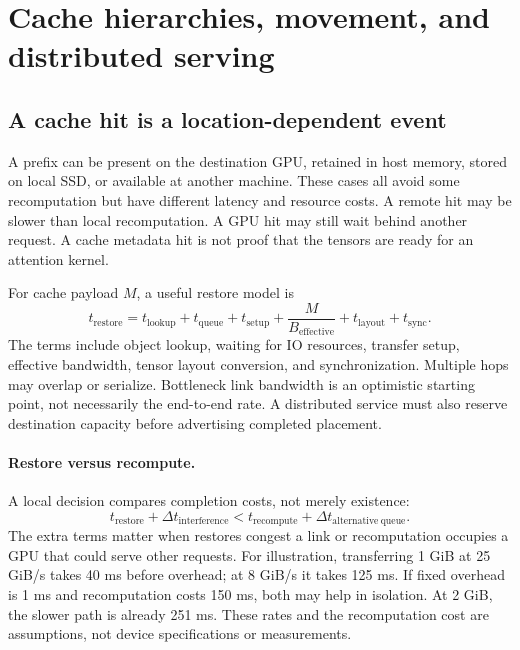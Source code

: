 \section{Cache hierarchies, movement, and distributed serving}
\label{sec:hierarchy}
\subsection{A cache hit is a location-dependent event}
A prefix can be present on the destination GPU, retained in host memory, stored
on local SSD, or available at another machine. These cases all avoid some
recomputation but have different latency and resource costs. A remote hit may
be slower than local recomputation. A GPU hit may still wait behind another
request. A cache metadata hit is not proof that the tensors are ready for an
attention kernel.

For cache payload $M$, a useful restore model is
\begin{equation}
 t_{\mathrm{restore}}=t_{\mathrm{lookup}}+t_{\mathrm{queue}}+
 t_{\mathrm{setup}}+\frac{M}{B_{\mathrm{effective}}}+t_{\mathrm{layout}}+
 t_{\mathrm{sync}}.
 \label{eq:restore}
\end{equation}
The terms include object lookup, waiting for IO resources, transfer setup,
effective bandwidth, tensor layout conversion, and synchronization. Multiple
hops may overlap or serialize. Bottleneck link bandwidth is an optimistic
starting point, not necessarily the end-to-end rate. A distributed service must
also reserve destination capacity before advertising completed placement.


\paragraph{Restore versus recompute.}
A local decision compares completion costs, not merely existence:
\begin{equation}
 t_{\mathrm{restore}}+\Delta t_{\mathrm{interference}}
 < t_{\mathrm{recompute}}+\Delta t_{\mathrm{alternative\ queue}}.
 \label{eq:break-even}
\end{equation}
The extra terms matter when restores congest a link or recomputation occupies a
GPU that could serve other requests. For illustration, transferring 1 GiB at
25 GiB/s takes 40 ms before overhead; at 8 GiB/s it takes 125 ms. If fixed
overhead is 1 ms and recomputation costs 150 ms, both may help in isolation.
At 2 GiB, the slower path is already 251 ms. These rates and the recomputation
cost are assumptions, not device specifications or measurements.

